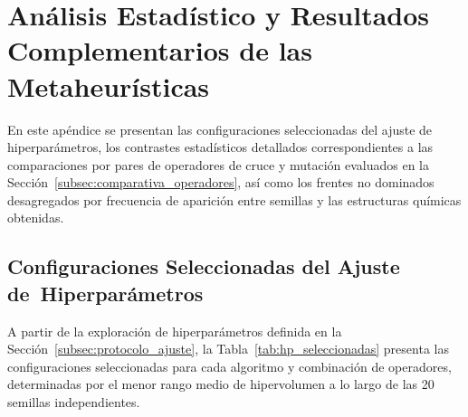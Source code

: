 \chapter{Análisis Estadístico y Resultados Complementarios de las Metaheurísticas}
\label{apendice:metaheuristicas_complementario}
\label{apendice:wilcoxon}

En este apéndice se presentan las configuraciones seleccionadas del ajuste de hiperparámetros, los contrastes estadísticos detallados correspondientes a las comparaciones por pares de operadores de cruce y mutación evaluados en la Sección~\ref{subsec:comparativa_operadores}, así como los frentes no dominados desagregados por frecuencia de aparición entre semillas y las estructuras químicas obtenidas.

\section{Configuraciones Seleccionadas del Ajuste de~Hiperparámetros}
\label{sec:apendice_hp_seleccionadas}

A partir de la exploración de hiperparámetros definida en la Sección~\ref{subsec:protocolo_ajuste}, la Tabla~\ref{tab:hp_seleccionadas} presenta las configuraciones seleccionadas para cada algoritmo y combinación de operadores, determinadas por el menor rango medio de hipervolumen a lo largo de las 20 semillas independientes.

